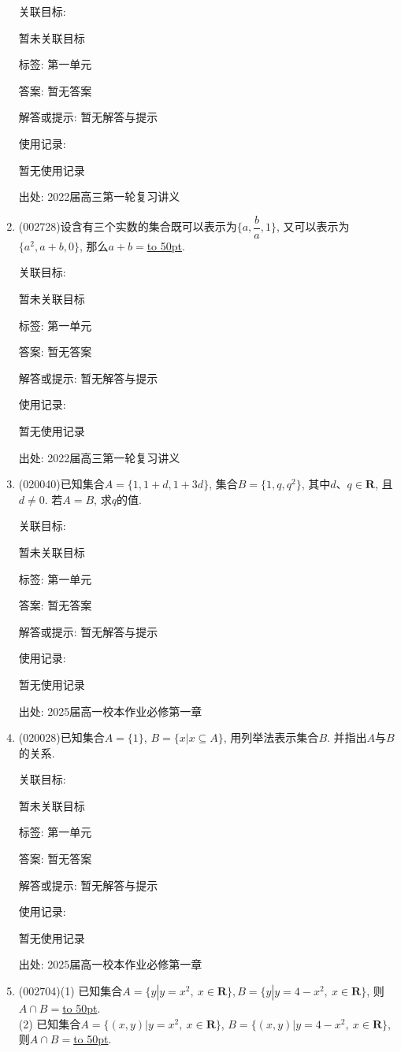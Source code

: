 \documentclass[10pt,a4paper]{article}
\newcommand{\blank}[1]{\underline{\hbox to #1pt{}}}
\begin{document}
\begin{enumerate}[1.]
关联目标:

暂未关联目标



标签: 第一单元

答案: 暂无答案

解答或提示: 暂无解答与提示

使用记录:

暂无使用记录


出处: 2022届高三第一轮复习讲义
\item { (002728)}设含有三个实数的集合既可以表示为$\{a,\dfrac ba,1\}$, 又可以表示为$\{a^2,a+b,0\}$, 那么$a+b=$\blank{50}.


关联目标:

暂未关联目标



标签: 第一单元

答案: 暂无答案

解答或提示: 暂无解答与提示

使用记录:

暂无使用记录


出处: 2022届高三第一轮复习讲义
\item { (020040)}已知集合$A=\{1, 1+d, 1+3d\}$, 集合$B=\{1, q, q^2\}$, 其中$d$、$q\in \mathbf{R}$, 且$d\ne 0$. 若$A=B$, 求$q$的值.


关联目标:

暂未关联目标



标签: 第一单元

答案: 暂无答案

解答或提示: 暂无解答与提示

使用记录:

暂无使用记录


出处: 2025届高一校本作业必修第一章
\item { (020028)}已知集合$A=\{1\}$, $B=\{x|x\subseteq A\}$, 用列举法表示集合$B$. 并指出$A$与$B$的关系.


关联目标:

暂未关联目标



标签: 第一单元

答案: 暂无答案

解答或提示: 暂无解答与提示

使用记录:

暂无使用记录


出处: 2025届高一校本作业必修第一章
\item { (002704)}(1) 已知集合$A=\{y|y=x^2, \ x\in \mathbf{R}\}, B=\{y|y=4-x^2, \ x\in \mathbf{R}\}$, 则$A\cap B=$\blank{50}.\\
(2) 已知集合$A=\{(x,y)|y={x^2},\ x\in \mathbf{R}\}$, $B=\{(x,y)|y=4-x^2, \ x\in \mathbf{R}\}$, 则$A\cap B=$\blank{50}.



\end{enumerate}
\end{document}
